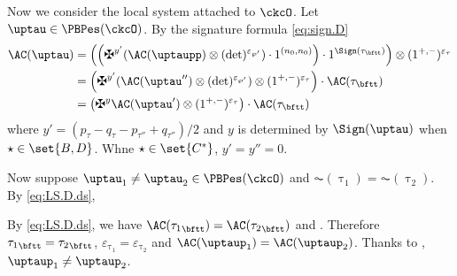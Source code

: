 \documentclass[ssunip]{subfiles}
\begin{document}
\subsubsection{}

Now we consider the local system attached to $\ckcO$.
Let $\uptau\in \PBPes(\ckcO)$.
By the signature formula \eqref{eq:sign.D}
\begin{equation}\label{eq:LS.D.ds}
  \begin{split}
  \AC(\uptau)  & =\left( \left(\maltese^{y'}
    (\AC(\uptaupp)\otimes (\det)^{\varepsilon_{\wp'}})
    \cdot 1^{(n_{0},n_{0})}\right) \cdot
   1^{\Sign(\tau_{\bftt})} \right) \otimes (1^{+,-})^{\varepsilon_{\tau}}\\
  & =\left(\maltese^{y'} (\AC(\uptau'')\otimes (\det)^{\varepsilon_{\wp'}}) \otimes (1^{+,-})^{\varepsilon_{\tau}}
    \right) \cdot \AC(\tau_{\bftt})\\
  & =\left(\maltese^{y} \AC(\uptau') \otimes (1^{+,-})^{\varepsilon_{\tau}}
    \right) \cdot \AC(\tau_{\bftt})
  \end{split}
\end{equation}
where $y' = (p_{\tau}-q_{\tau}-p_{\tau''}+q_{\tau''})/2$ and $y$ is determined
by $\Sign(\uptau)$ when
$\star\in \set{B,D}$.
Whne $\star\in \set{C^{*}}$, $y'=y''=0$.





Now suppose $\uptau_{1} \neq \uptau_{2} \in \PBPes(\ckcO)$ and
$\AC({\uptau_{1}})=\AC( \uptau_{2} )$. By \eqref{eq:LS.D.ds},

By \eqref{eq:LS.D.ds}, we have
$\AC({{\tau_{1}}_{\bftt}}) = \AC({{\tau_{2}}_{\bftt}})$ and .
Therefore
${\tau_{1}}_{\bftt}={\tau_{2}}_{\bftt}$, $\varepsilon_{\uptau_{1}} =\varepsilon_{\uptau_{2}}$ and
$\AC( \uptaup_{1} )=\AC(\uptaup_{2} )$.
Thanks to , $\uptaup_{1} \neq \uptaup_{2}$.
\end{document}
